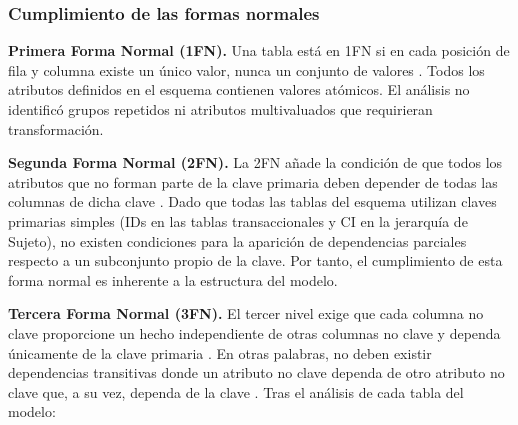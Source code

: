 \subsubsection*{Cumplimiento de las formas normales}

\textbf{Primera Forma Normal (1FN).} Una tabla está en 1FN si en cada posición de fila y columna existe un único valor, nunca un conjunto de valores \cite{ibm-admin-guide}. 
Todos los atributos definidos en el esquema contienen valores atómicos. 
El análisis no identificó grupos repetidos ni atributos multivaluados que requirieran transformación.

\textbf{Segunda Forma Normal (2FN).} La 2FN añade la condición de que todos los atributos que no forman parte de la clave primaria deben depender de todas las columnas de dicha clave  \cite{ibm-admin-guide}. 
Dado que todas las tablas del esquema utilizan claves primarias simples (IDs en las tablas transaccionales y CI en la jerarquía de Sujeto), no existen condiciones para la aparición de dependencias parciales respecto a un subconjunto propio de la clave. 
Por tanto, el cumplimiento de esta forma normal es inherente a la estructura del modelo.

\textbf{Tercera Forma Normal (3FN).}  El tercer nivel exige que cada columna no clave proporcione un hecho independiente de otras columnas no clave y dependa únicamente de la clave primaria \cite{ibm-admin-guide}. 
En otras palabras, no deben existir dependencias transitivas donde un atributo no clave dependa de otro atributo no clave que, a su vez, dependa de la clave \cite{ibm-third-normal-form}. 
Tras el análisis de cada tabla del modelo:

